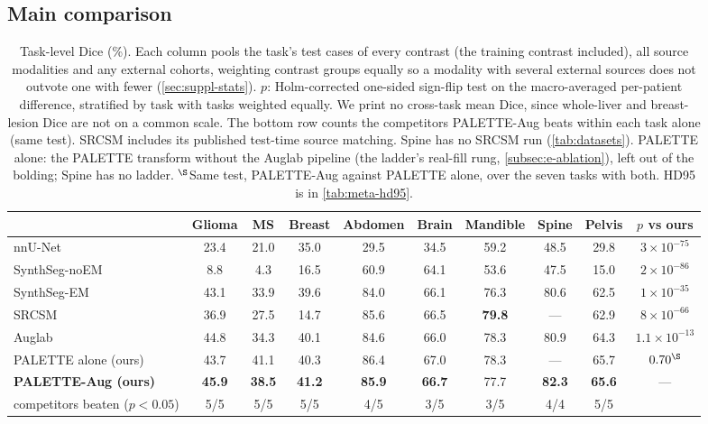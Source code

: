 \subsection{Main comparison}
\label{subsec:e-main}

\begin{table}[t]
\centering
\small
\setlength{\tabcolsep}{4pt}
\begin{tabular}{lcccccccc|c}
\toprule
 & Glioma & MS & Breast & Abdomen & Brain & Mandible & Spine & Pelvis & $p$ vs ours \\
\midrule
nnU-Net         & 23.4 & 21.0 & 35.0 & 29.5 & 34.5 & 59.2 & 48.5 & 29.8 & $3\times10^{-75}$ \\
SynthSeg-noEM   &  8.8 &  4.3 & 16.5 & 60.9 & 64.1 & 53.6 & 47.5 & 15.0 & $2\times10^{-86}$ \\
SynthSeg-EM     & 43.1 & 33.9 & 39.6 & 84.0 & 66.1 & 76.3 & 80.6 & 62.5 & $1\times10^{-35}$ \\
SRCSM           & 36.9 & 27.5 & 14.7 & 85.6 & 66.5 & \textbf{79.8} & --- & 62.9 & $8\times10^{-66}$ \\
Auglab          & 44.8 & 34.3 & 40.1 & 84.6 & 66.0 & 78.3 & 80.9 & 64.3 & $1.1\times10^{-13}$ \\
\midrule
PALETTE alone (ours) & 43.7 & 41.1 & 40.3 & 86.4 & 67.0 & 78.3 & --- & 65.7 & $0.70^\S$ \\
\textbf{PALETTE-Aug (ours)} & \textbf{45.9} & \textbf{38.5} & \textbf{41.2} & \textbf{85.9} & \textbf{66.7} & 77.7 & \textbf{82.3} & \textbf{65.6} & --- \\
\midrule
\multicolumn{1}{r}{\footnotesize competitors beaten ($p<0.05$)} &
5/5 & 5/5 & 5/5 & 4/5 & 3/5 & 3/5 & 4/4 & 5/5 & \\
\bottomrule
\end{tabular}
\caption{Task-level Dice (\%). Each column pools the task's test cases of every contrast (the
training contrast included), all source modalities and any external cohorts,
weighting contrast groups equally so a modality with several external sources
does not outvote one with fewer (\cref{sec:suppl-stats}). $p$: Holm-corrected one-sided sign-flip test on
the macro-averaged per-patient difference, stratified by task with tasks weighted equally. We print no cross-task mean
Dice, since whole-liver and breast-lesion Dice are not on a common scale. The bottom row counts the competitors PALETTE-Aug beats
within each task alone (same test). SRCSM includes its published test-time
source matching. Spine has no SRCSM run
(\cref{tab:datasets}). PALETTE alone: the PALETTE transform without the Auglab pipeline (the ladder's real-fill rung, \cref{subsec:e-ablation}), left out of the bolding; Spine has no ladder. $^\S$Same test, PALETTE-Aug against PALETTE alone, over the seven tasks with both. HD95 is in \cref{tab:meta-hd95}.}
\label{tab:meta}
\end{table}

